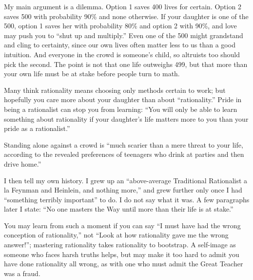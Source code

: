 My main argument is a dilemma. Option 1 saves 400 lives for certain. Option 2 saves 500 with probability 90\% and none otherwise. If your daughter is one of the 500, option 1 saves her with probability 80\% and option 2 with 90\%, and love may push you to ``shut up and multiply.'' Even one of the 500 might grandstand and cling to certainty, since our own lives often matter less to us than a good intuition. And everyone in the crowd is someone's child, so altruists too should pick the second. The point is not that one life outweighs 499, but that more than your own life must be at stake before people turn to math. 

Many think rationality means choosing only methods certain to work; but hopefully you care more about your daughter than about ``rationality.'' Pride in being a rationalist can stop you from learning: ``You will only be able to learn something about rationality if your daughter's life matters more to you than your pride as a rationalist.''

Standing alone against a crowd is ``much scarier than a mere threat to your life, according to the revealed preferences of teenagers who drink at parties and then drive home.''

I then tell my own history. I grew up an ``above-average Traditional Rationalist a la Feynman and Heinlein, and nothing more,'' and grew further only once I had ``something terribly important'' to do. I do not say what it was. A few paragraphs later I state: ``No one masters the Way until more than their life is at stake.'' 

You may learn from such a moment if you can say ``I must have had the wrong conception of rationality,'' not ``Look at how rationality gave me the wrong answer!''; mastering rationality takes rationality to bootstrap. A self-image as someone who faces harsh truths helps, but may make it too hard to admit you have done rationality all wrong, as with one who must admit the Great Teacher was a fraud.


